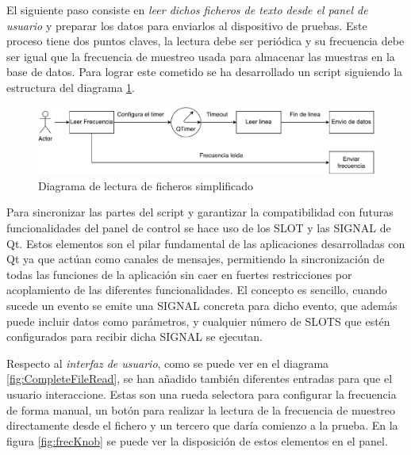 
        El siguiente paso consiste en \textit{leer dichos ficheros de texto desde el panel de usuario} y preparar los datos para enviarlos al dispositivo de pruebas. Este proceso tiene dos puntos claves, la lectura debe ser periódica y su frecuencia debe ser igual que la frecuencia de muestreo usada para almacenar las muestras en la base de datos. Para lograr este cometido se ha desarrollado un script siguiendo la estructura del diagrama \ref{fig:SimpleFileRead}. 

        \begin{figure}[H]  
                \centering
                        \includegraphics[width =\linewidth]{figuras/SimpleFileRead.pdf}
                \caption{Diagrama de lectura de ficheros simplificado}
                \label{fig:SimpleFileRead}
        \end{figure}

        Para sincronizar las partes del script y garantizar la compatibilidad con futuras funcionalidades del panel de control se hace uso de los SLOT y las SIGNAL de Qt. Estos elementos son el pilar fundamental de las aplicaciones desarrolladas con Qt ya que actúan como canales de mensajes, permitiendo la sincronización de todas las funciones de la aplicación sin caer en fuertes restricciones por acoplamiento de las diferentes funcionalidades. El concepto es sencillo, cuando sucede un evento se emite una SIGNAL concreta para dicho evento, que además puede incluir datos como parámetros, y cualquier número de SLOTS que estén configurados para recibir dicha SIGNAL se ejecutan. 

        Respecto al \textit{interfaz de usuario}, como se puede ver en el diagrama \ref{fig:CompleteFileRead}, se han añadido también diferentes entradas para que el usuario interaccione. Estas son una rueda selectora para configurar la frecuencia de forma manual, un botón para realizar la lectura de la frecuencia de muestreo directamente desde el fichero y un tercero que daría comienzo a la prueba. En la figura \ref{fig:frecKnob} se puede ver la disposición de estos elementos en el panel.

